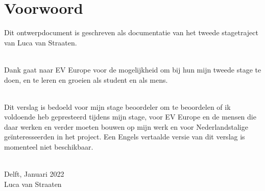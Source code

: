 \chapter*{Voorwoord}

Dit ontwerpdocument is geschreven als documentatie van het tweede stagetraject
van Luca van Straaten.\\\

Dank gaat naar EV Europe voor de mogelijkheid om bij hun mijn tweede stage te
doen, en te leren en groeien als student en als mens.\\\

Dit verslag is bedoeld voor mijn stage beoordeler om te beoordelen of ik
voldoende heb gepresteerd tijdens mijn stage, voor EV Europe en de mensen die
daar werken en verder moeten bouwen op mijn werk en voor Nederlandstalige
geïnteresseerden in het project. Een Engels vertaalde versie van dit verslag
is momenteel niet beschikbaar.\\\

Delft, Januari 2022\\Luca van Straaten
